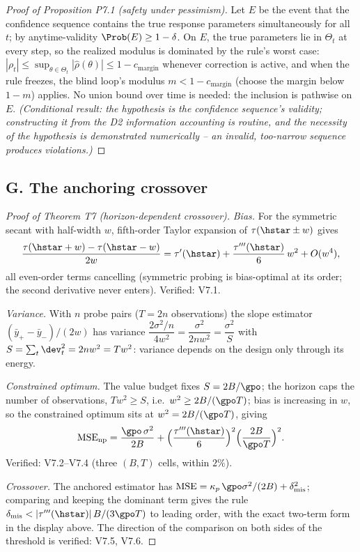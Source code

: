 \begin{proof}[Proof of Proposition P7.1 (safety under pessimism)]
Let $E$ be the event that the confidence sequence contains the true
response parameters simultaneously for all $t$; by anytime-validity
$\Prob(E) \ge 1-\delta$. On $E$, the true parameters lie in $\Theta_t$ at
every step, so the realized modulus is dominated by the rule's worst case:
$|\rho_t| \le \sup_{\theta\in\Theta_t}|\hat\rho(\theta)| \le 1 -
c_{\mathrm{margin}}$ whenever correction is active, and when the rule
freezes, the blind loop's modulus $m < 1 - c_{\mathrm{margin}}$ (choose the
margin below $1 - m$) applies. No union bound over time is needed: the
inclusion is pathwise on $E$. \emph{(Conditional result: the hypothesis is
the confidence sequence's validity; constructing it from the D2
information accounting is routine, and the necessity of the hypothesis is
demonstrated numerically -- an invalid, too-narrow sequence produces
violations.)}
\end{proof}

\subsection*{G. The anchoring crossover}

\begin{proof}[Proof of Theorem T7 (horizon-dependent crossover)]
\emph{Bias.} For the symmetric secant with half-width $w$, fifth-order
Taylor expansion of $\tau(\hstar \pm w)$ gives
\[
\frac{\tau(\hstar + w) - \tau(\hstar - w)}{2w}
 = \tau'(\hstar) + \frac{\tau'''(\hstar)}{6}\,w^2 + O(w^4),
\]
all even-order terms cancelling (symmetric probing is bias-optimal at its
order; the second derivative never enters). Verified: V7.1.

\emph{Variance.} With $n$ probe pairs ($T = 2n$ observations) the slope
estimator $(\bar y_+ - \bar y_-)/(2w)$ has variance
$\dfrac{2\sigma^2/n}{4w^2} = \dfrac{\sigma^2}{2nw^2} = \dfrac{\sigma^2}{S}$ with
$S = \sum_t \dev_t^2 = 2n w^2 = T w^2$: variance depends on the design only
through its energy.

\emph{Constrained optimum.} The value budget fixes $S = 2B/\gpo$; the
horizon caps the number of observations, $T w^2 \ge S$, i.e.\
$w^2 \ge 2B/(\gpo T)$; bias is increasing in $w$, so the constrained
optimum sits at $w^2 = 2B/(\gpo T)$, giving
\[
\mathrm{MSE}_{\mathrm{np}} = \frac{\gpo\,\sigma^2}{2B}
 + \Big(\frac{\tau'''(\hstar)}{6}\Big)^2\Big(\frac{2B}{\gpo T}\Big)^2 .
\]
Verified: V7.2--V7.4 (three $(B, T)$ cells, within $2\%$).

\emph{Crossover.} The anchored estimator has
$\mathrm{MSE} = \kappa_p\,\gpo\sigma^2/(2B) + \delta_{\mathrm{mis}}^2$;
comparing and keeping the dominant term gives the rule
$\delta_{\mathrm{mis}} < |\tau'''(\hstar)|\,B/(3\gpo T)$ to leading order,
with the exact two-term form in the display above. The direction of the
comparison on both sides of the threshold is verified: V7.5, V7.6.
\end{proof}

